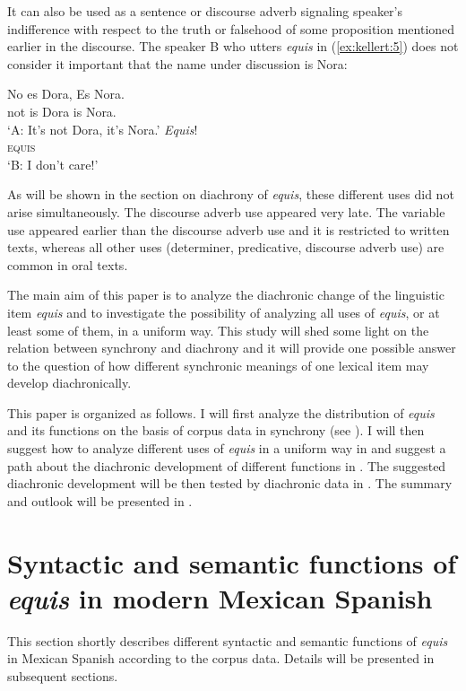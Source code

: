 \documentclass[output=paper]{langsci/langscibook}
\begin{document}
It can also be used as a sentence or discourse adverb signaling speaker’s indifference with respect to the truth or falsehood of some proposition mentioned earlier in the discourse. The speaker B who utters \textit{equis} in (\ref{ex:kellert:5}) does not consider it important that the name under discussion is Nora:

\ea\label{ex:kellert:5}
\begin{xlist}
\gll No es Dora, Es Nora.\\
not is Dora is Nora.\\
\glt ‘A: It’s not Dora, it’s Nora.’
\gll \textit{Equis}!\\
\textsc{equis}\\
\glt ‘B: I don’t care!’
\end{xlist}
\z

As will be shown in the section on diachrony of \textit{equis}, these different uses did not arise simultaneously. The discourse adverb use appeared very late. The variable use appeared earlier than the discourse adverb use and it is restricted to written texts, whereas all other uses (determiner, predicative, discourse adverb use) are common in oral texts.

The main aim of this paper is to analyze the diachronic change of the linguistic item \textit{equis} and to investigate the possibility of analyzing all uses of \textit{equis}, or at least some of them, in a uniform way.
This study will shed some light on the relation between synchrony and diachrony and it will provide one possible answer to the question of how different synchronic meanings of one lexical item may develop diachronically.

This paper is organized as follows. I will first analyze the distribution of \textit{equis} and its functions on the basis of corpus data in synchrony (see ). I will then suggest how to analyze different uses of \textit{equis} in a uniform way in  and suggest a path about the diachronic development of different functions in . The suggested diachronic development will be then tested by diachronic data in . The summary and outlook will be presented in .

\section{Syntactic and semantic functions of \textit{equis} in modern Mexican Spanish}\label{sec:kellert:2}
This section shortly describes different syntactic and semantic functions of \textit{equis} in Mexican Spanish according to the corpus data. Details will be presented in subsequent sections.
\end{document}
